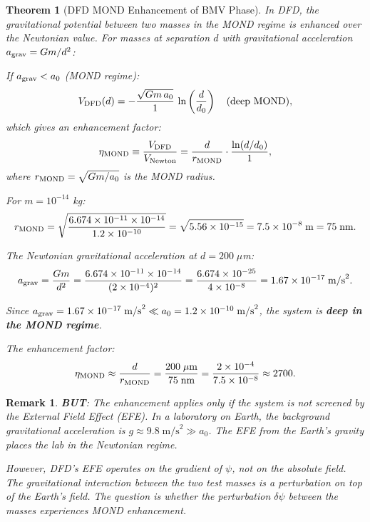 \documentclass[11pt,a4paper]{article}
\newtheorem{theorem}{Theorem}
\newtheorem{remark}{Remark}
\begin{document}
\begin{theorem}[DFD MOND Enhancement of BMV Phase]
\label{thm:BMV-enhancement}
In DFD, the gravitational potential between two masses in the MOND regime is enhanced over the Newtonian value. For masses at separation $d$ with gravitational acceleration $a_{\rm grav} = Gm/d^2$:

If $a_{\rm grav} < a_0$ (MOND regime):
\begin{equation}
V_{\rm DFD}(d) = -\frac{\sqrt{Gm\,a_0}}{1}\,\ln\left(\frac{d}{d_0}\right) \quad\text{(deep MOND)},
\end{equation}
which gives an enhancement factor:
\begin{equation}
\eta_{\rm MOND} \equiv \frac{V_{\rm DFD}}{V_{\rm Newton}} = \frac{d}{r_{\rm MOND}}\cdot\frac{\ln(d/d_0)}{1},
\end{equation}
where $r_{\rm MOND} = \sqrt{Gm/a_0}$ is the MOND radius.

For $m = 10^{-14}$ kg:
\begin{equation}
r_{\rm MOND} = \sqrt{\frac{6.674\times 10^{-11}\times 10^{-14}}{1.2\times 10^{-10}}} = \sqrt{5.56\times 10^{-15}} = 7.5\times 10^{-8}\;\text{m} = 75\;\text{nm}.
\end{equation}

The Newtonian gravitational acceleration at $d = 200\;\mu$m:
\begin{equation}
a_{\rm grav} = \frac{Gm}{d^2} = \frac{6.674\times 10^{-11}\times 10^{-14}}{(2\times 10^{-4})^2} = \frac{6.674\times 10^{-25}}{4\times 10^{-8}} = 1.67\times 10^{-17}\;\text{m/s}^2.
\end{equation}

Since $a_{\rm grav} = 1.67\times 10^{-17}\;\text{m/s}^2 \ll a_0 = 1.2\times 10^{-10}\;\text{m/s}^2$, the system is \textbf{deep in the MOND regime}.

The enhancement factor:
\begin{equation}
\eta_{\rm MOND} \approx \frac{d}{r_{\rm MOND}} = \frac{200\;\mu\text{m}}{75\;\text{nm}} = \frac{2\times 10^{-4}}{7.5\times 10^{-8}} \approx 2700.
\end{equation}
\end{theorem}

\begin{remark}
\textbf{BUT}: The enhancement applies only if the system is not screened by the External Field Effect (EFE). In a laboratory on Earth, the background gravitational acceleration is $g \approx 9.8\;\text{m/s}^2 \gg a_0$. The EFE from the Earth's gravity places the lab in the Newtonian regime.

However, DFD's EFE operates on the \emph{gradient} of $\psi$, not on the absolute field. The gravitational interaction between the two test masses is a \emph{perturbation} on top of the Earth's field. The question is whether the perturbation $\delta\psi$ between the masses experiences MOND enhancement.
\end{remark}
\end{document}
